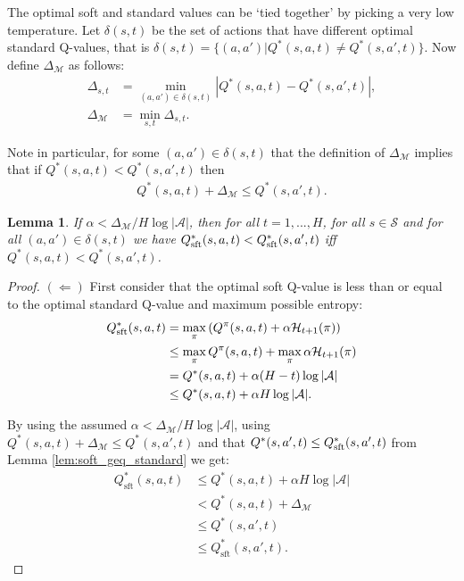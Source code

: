 \documentclass{article}
\newcommand{\cl}[1]{\mathcal{#1}}
\newcommand{\Qss}[2]{Q^*_{\textnormal{sft}}(#1,#2)}
\theoremstyle{plain}
\newtheorem{lemma}[theorem]{Lemma}
\begin{document}
\begin{appendices}
    
    
    
    
        The optimal soft and standard values can be `tied together' by picking a very low temperature. Let $\delta(s,t)$ be the set of actions that have different optimal standard Q-values, that is $\delta(s,t)=\{(a,a')|Q^*(s,a,t)\neq Q^*(s,a',t)\}$. Now define $\Delta_{\cl{M}}$ as follows:
        \begin{align}
            \Delta_{s,t} &= \min_{(a,a')\in\delta(s,t)} |Q^*(s,a,t)-Q^*(s,a',t)|, \\
            \Delta_{\cl{M}} &= \min_{s,t} \Delta_{s,t}. \label{eq:delta}
        \end{align}
    
        Note in particular, for some $(a,a')\in\delta(s,t)$ that the definition of $\Delta_{\cl{M}}$ implies that if $Q^*(s,a,t)<Q^*(s,a',t)$ then 
        \begin{align}
            Q^*(s,a,t)+\Delta_{\cl{M}}\leq Q^*(s,a',t). \label{appeq:delta_diff}
        \end{align}





        
    
        \begin{lemma} \label{lem:soft_standard_consistent_order}
            If $\alpha < \Delta_{\cl{M}} / H\log |\cl{A}|$, then for all $t=1,...,H$, for all $s\in\cl{S}$ and for all $(a,a')\in\delta(s,t)$ we have $Q_{\textnormal{sft}}^*(s,a,t)<Q_{\textnormal{sft}}^*(s,a',t)$ iff $Q^*(s,a,t) < Q^*(s,a',t)$.
        \end{lemma}
        \begin{proof}
            $(\Leftarrow)$ First consider that the optimal soft Q-value is less than or equal to the optimal standard Q-value and maximum possible entropy:
            \begin{align}
                Q_{\textnormal{sft}}^*(s,a,t) &= \max_\pi \left(Q^{\pi}(s,a,t) + \alpha\cl{H}_{t+1}(\pi)\right) \\
                    &\leq \max_\pi Q^{\pi}(s,a,t) + \max_\pi \alpha\cl{H}_{t+1}(\pi) \label{appeq:softdiv} \\
                    &= Q^*(s,a,t) + \alpha (H-t)\log |\cl{A}| \\
                    &\leq Q^*(s,a,t) + \alpha H\log |\cl{A}|.
            \end{align}
            
            By using the assumed $\alpha < \Delta_{\cl{M}} / H\log |\cl{A}|$, using $Q^*(s,a,t)+\Delta_{\cl{M}}\leq Q^*(s,a',t)$ and that $Q^*(s,a',t)\leq \Qss{s}{a',t}$  from Lemma \ref{lem:soft_geq_standard} we get:
            \begin{align}
                Q_{\text{sft}}^*(s,a,t) &\leq Q^*(s,a,t) + \alpha H\log |\cl{A}| \\
                    &< Q^*(s,a,t) + \Delta_{\cl{M}} \\
                    &\leq Q^*(s,a',t) \\
                    &\leq Q_{\text{sft}}^*(s,a',t).
            \end{align}
            

\end{proof}
\end{appendices}
\end{document}
